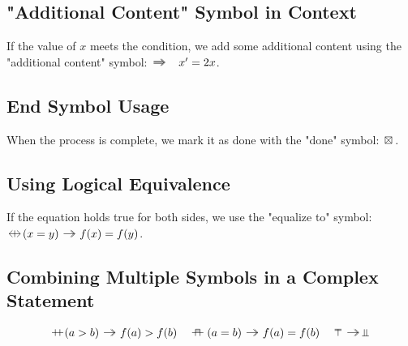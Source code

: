 \documentclass{iac}
\begin{document}
\subsection{"Additional Content" Symbol in Context}

If the value of $x$ meets the condition, we add some additional content using the "additional content" symbol: 
$\additionalcontent \quad x' = 2x$.

\subsection{End Symbol Usage}

When the process is complete, we mark it as done with the "done" symbol: 
$\doneL$.

\subsection{Using Logical Equivalence}

If the equation holds true for both sides, we use the "equalize to" symbol: 
$\logicalEquL (x = y) \toL f(x) = f(y)$.

\subsection{Combining Multiple Symbols in a Complex Statement}

$$
    \ifL (a > b) \toL f(a) > f(b) \quad 
    \elifL (a = b) \toL f(a) = f(b) \quad 
    \elseL \toL \undefinedL
$$
\end{document}
